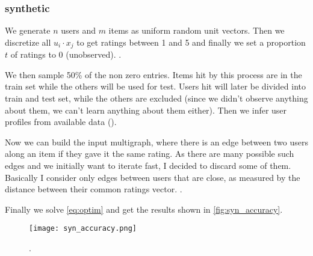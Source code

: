\subsubsection{synthetic}

We generate $n$ users and $m$ items as uniform random unit vectors. Then we
discretize all $u_i\cdot x_j$ to get ratings between 1 and 5 and finally we
set a proportion $t$ of ratings to 0 (unobserved). .

We then sample 50\% of the non zero entries. Items hit by this process are in
the train set while the others will be used for test. Users hit will later be
divided into train and test set, while the others are excluded (since we
didn't observe anything about them, we can't learn anything about them either).
Then we infer user profiles from available data ().

Now we can build the input multigraph, where there is an edge between two users
along an item if they gave it the same rating. As there are many possible such
edges and we initially want to iterate fast, I decided to discard some of them.
Basically I consider only edges between users that are close, as measured by
the distance between their common ratings vector. .

Finally we solve \eqref{eq:optim} and get the results shown in
\autoref{fig:syn_accuracy}.

\begin{figure}[hb]
	\centering
	\texttt{[image: syn\_accuracy.png]}
	\caption{.\label{fig:syn_accuracy}}
\end{figure}
